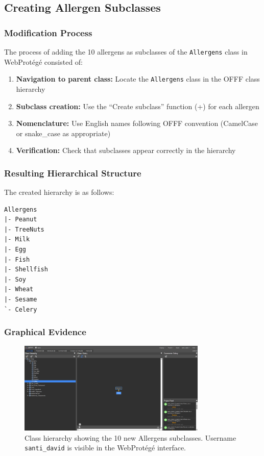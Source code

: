 \documentclass[12pt,a4paper]{article}
\begin{document}
\subsection{Creating Allergen Subclasses}

\subsubsection{Modification Process}

The process of adding the 10 allergens as subclasses of the \texttt{Allergens} class in WebProtégé consisted of:

\begin{enumerate}
    \item \textbf{Navigation to parent class:} Locate the \texttt{Allergens} class in the OFFF class hierarchy
    \item \textbf{Subclass creation:} Use the ``Create subclass'' function (+) for each allergen
    \item \textbf{Nomenclature:} Use English names following OFFF convention (CamelCase or snake\_case as appropriate)
    \item \textbf{Verification:} Check that subclasses appear correctly in the hierarchy
\end{enumerate}

\subsubsection{Resulting Hierarchical Structure}

The created hierarchy is as follows:

\begin{verbatim}
Allergens
|- Peanut
|- TreeNuts
|- Milk
|- Egg
|- Fish
|- Shellfish
|- Soy
|- Wheat
|- Sesame
`- Celery
\end{verbatim}


\subsubsection{Graphical Evidence}

\begin{figure}[H]
    \centering
    \includegraphics[width=0.8\textwidth]{screenshots/Allergens.png}
    \caption{Class hierarchy showing the 10 new Allergens subclasses. Username \texttt{santi\_david} is visible in the WebProtégé interface.}
    \label{fig:allergens_hierarchy}
\end{figure}
\end{document}
